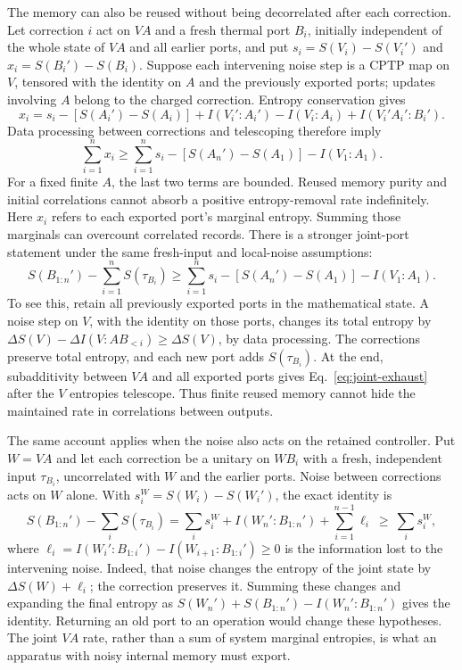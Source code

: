 \documentclass[12pt,a4paper]{article}
\begin{document}
The memory can also be reused without being decorrelated after each correction.
Let correction $i$ act on $VA$ and a fresh thermal port $B_i$, initially independent
of the whole state of $VA$ and all earlier ports, and put
$s_i=S(V_i)-S(V_i')$ and $x_i=S(B_i')-S(B_i)$.
Suppose each intervening noise step is a CPTP map on $V$, tensored with the
identity on $A$ and the previously exported ports; updates involving $A$ belong
to the charged correction. Entropy conservation gives
\[
 x_i=s_i-[S(A_i')-S(A_i)]
       +I(V_i':A_i')-I(V_i:A_i)+I(V_i'A_i':B_i').
\]
Data processing between corrections and telescoping therefore imply
\begin{equation}\label{eq:reused-memory}
 \sum_{i=1}^n x_i\ge
 \sum_{i=1}^n s_i-[S(A_n')-S(A_1)]-I(V_1:A_1).
\end{equation}
For a fixed finite $A$, the last two terms are bounded. Reused memory purity and
initial correlations cannot absorb a positive entropy-removal rate indefinitely.
Here $x_i$ refers to each exported port's marginal entropy. Summing those marginals
can overcount correlated records. There is a stronger joint-port statement under
the same fresh-input and local-noise assumptions:
\begin{equation}\label{eq:joint-exhaust}
 S(B_{1:n}')-\sum_{i=1}^n S(\tau_{B_i})\ge
 \sum_{i=1}^n s_i-[S(A_n')-S(A_1)]-I(V_1:A_1).
\end{equation}
To see this, retain all previously exported ports in the mathematical state.
A noise step on $V$, with the identity on those ports, changes its
total entropy by $\Delta S(V)-\Delta I(V:A B_{<i})\ge\Delta S(V)$, by data
processing. The corrections preserve total entropy, and each new port adds
$S(\tau_{B_i})$. At the end, subadditivity between $VA$ and all exported ports
gives Eq.~\eqref{eq:joint-exhaust} after the $V$ entropies telescope. Thus finite
reused memory cannot hide the maintained rate in correlations between outputs.

The same account applies when the noise also acts on the retained controller.
Put $W=VA$ and let each correction be a unitary on $WB_i$ with a fresh,
independent input $\tau_{B_i}$, uncorrelated with $W$ and the earlier ports.
Noise between corrections acts on $W$ alone.
With $s_i^W=S(W_i)-S(W_i')$, the exact identity is
\begin{equation}\label{eq:joint-VA-exhaust}
 S(B_{1:n}')-\sum_iS(\tau_{B_i})
 =\sum_i s_i^W+I(W_n':B_{1:n}')+\sum_{i=1}^{n-1}\ell_i
 \ \ge\ \sum_i s_i^W,
\end{equation}
where $\ell_i=I(W_i':B_{1:i}')-I(W_{i+1}:B_{1:i}')\ge0$ is the information
lost to the intervening noise. Indeed, that noise changes the entropy of the
joint state by $\Delta S(W)+\ell_i$; the correction preserves it. Summing these
changes and expanding the final entropy as $S(W_n')+S(B_{1:n}')-I(W_n':B_{1:n}')$
gives the identity. Returning an old port to an operation would change these
hypotheses. The joint $VA$ rate, rather than a sum of system marginal entropies,
is what an apparatus with noisy internal memory must export.
\end{document}
